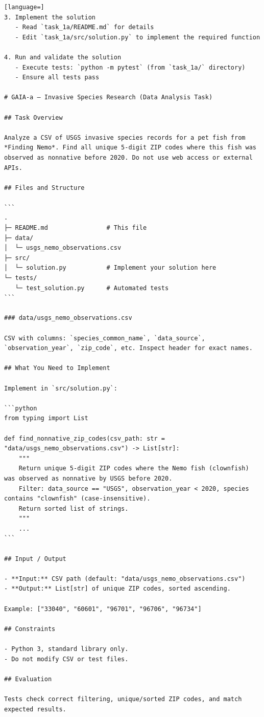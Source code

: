 \begin{appendices}
\begin{lstlisting}[language=]
3. Implement the solution
   - Read `task_1a/README.md` for details
   - Edit `task_1a/src/solution.py` to implement the required function

4. Run and validate the solution
   - Execute tests: `python -m pytest` (from `task_1a/` directory)
   - Ensure all tests pass

# GAIA-a – Invasive Species Research (Data Analysis Task)

## Task Overview

Analyze a CSV of USGS invasive species records for a pet fish from *Finding Nemo*. Find all unique 5-digit ZIP codes where this fish was observed as nonnative before 2020. Do not use web access or external APIs.

## Files and Structure

```
.
├─ README.md                # This file
├─ data/
│  └─ usgs_nemo_observations.csv
├─ src/
│  └─ solution.py           # Implement your solution here
└─ tests/
   └─ test_solution.py      # Automated tests
```

### data/usgs_nemo_observations.csv

CSV with columns: `species_common_name`, `data_source`, `observation_year`, `zip_code`, etc. Inspect header for exact names.

## What You Need to Implement

Implement in `src/solution.py`:

```python
from typing import List

def find_nonnative_zip_codes(csv_path: str = "data/usgs_nemo_observations.csv") -> List[str]:
    """
    Return unique 5-digit ZIP codes where the Nemo fish (clownfish) was observed as nonnative by USGS before 2020.
    Filter: data_source == "USGS", observation_year < 2020, species contains "clownfish" (case-insensitive).
    Return sorted list of strings.
    """
    ...
```

## Input / Output

- **Input:** CSV path (default: "data/usgs_nemo_observations.csv")
- **Output:** List[str] of unique ZIP codes, sorted ascending.

Example: ["33040", "60601", "96701", "96706", "96734"]

## Constraints

- Python 3, standard library only.
- Do not modify CSV or test files.

## Evaluation

Tests check correct filtering, unique/sorted ZIP codes, and match expected results.


\end{lstlisting}
\end{appendices}
